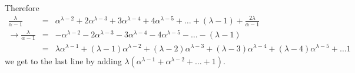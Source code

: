 \documentclass[aps,preprint,preprintnumbers,nofootinbib,showpacs,prd]{revtex4-1}
\newcommand{\nbea}{\begin{eqnarray*}}
\newcommand{\neea}{\end{eqnarray*}}
\begin{document}
Therefore
%
\nbea
\frac{\lambda}{\alpha - 1} & = & \alpha^{\lambda - 2} + 2\alpha^{\lambda - 3} + 3\alpha^{\lambda - 4} + 4\alpha^{\lambda - 5} + \dots + (\lambda - 1) + \frac{2\lambda}{\alpha - 1} \\
\to \frac{\lambda}{\alpha - 1} & = & -\alpha^{\lambda - 2} - 2\alpha^{\lambda - 3} - 3\alpha^{\lambda - 4} - 4\alpha^{\lambda - 5} - \dots - (\lambda - 1) \\
& = & \lambda \alpha^{\lambda -1} + (\lambda - 1)\alpha^{\lambda - 2} + (\lambda - 2)\alpha^{\lambda - 3} + (\lambda - 3)\alpha^{\lambda - 4} + (\lambda - 4)\alpha^{\lambda - 5} + \dots 1
\neea
%
we get to the last line by adding $\lambda(\alpha^{\lambda - 1} + \alpha^{\lambda - 2} + \dots + 1)$.
\end{document}
